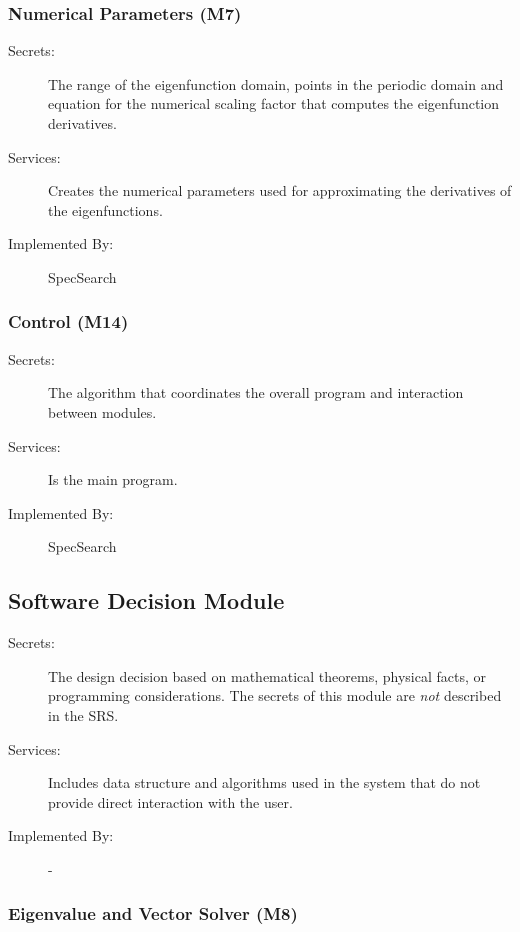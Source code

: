 \documentclass[12pt, titlepage]{article}
\begin{document}
\subsubsection{Numerical Parameters (M7)} 

\begin{description}
	\item[Secrets:] The range of the eigenfunction domain, points in the 
	periodic domain and equation for the numerical scaling factor that computes 
	the 
	eigenfunction derivatives. 
	\item[Services:] Creates the numerical parameters used for approximating 
	the derivatives of the eigenfunctions. 
	\item[Implemented By:] SpecSearch
\end{description} 

\subsubsection{Control (M14)} 

\begin{description}
	\item[Secrets:] The algorithm that coordinates the overall program and 
	interaction between modules. 
	\item[Services:] Is the main program.
	\item[Implemented By:] SpecSearch
\end{description}

\subsection{Software Decision Module}

\begin{description}
\item[Secrets:] The design decision based on mathematical theorems, physical
  facts, or programming considerations. The secrets of this module are
  \emph{not} described in the SRS.
\item[Services:] Includes data structure and algorithms used in the system that
  do not provide direct interaction with the user. 
\item[Implemented By:] -
\end{description}

\subsubsection{Eigenvalue and Vector Solver (M8)} 
\end{document}
